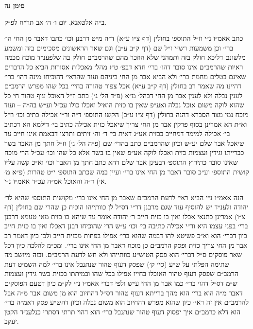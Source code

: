 \documentclass[12pt, openany]{book}
\newcommand{\chapname}{}
\newcommand{\newchap}[1]{
	\addcontentsline{toc}{chapter}{#1}
	\renewcommand{\chapname}{#1}
		\begin{center}
			\textbf{%
\fontsize{16pt}{16pt}\selectfont
				#1}
		\end{center}
}
\begin{document}
\newchap{סימן נה}
\begin{multicols}{2}
ב״ה אלטאנא, יום ו׳ ה׳ אב תר״ח לפ״ק.\\\vspace{0pt}

כתב אאמ״ו נ״י וז״ל התוספ׳ בחולין (דף צ״ו ע״א) ד״ה מ״ט דרבנן וכו׳ כתבו דאבר מן החי הו׳ ברי׳ וכן משמעות רש״י ז״ל שם (דף ק״ב ע״ב) וגם שאר הראשונים מסכימים בזה ומשמע מלשונם דליכא חולק בזה ותמהני שלא הוזכר מהם שהרמב״ם חולק בה שלפענ״ד מוכח מכמה ראיות שהרמב״ם אינו סובר דהו׳ ברי׳ חדא דבפ׳ ט״ז מהל׳ מאכלות אסורות הביא כל הדברים שאינם בטלים מחמת ברי׳ ולא הביא אבר מן החי ביניהם ועוד שהראי׳ דהוכיחו מינה דהו׳ ברי׳ דהיינו מה שאמר רב בחולין (דף ק״ב ע״א) אכל צפור טהורה בחיי׳ בכל שהו מפרש הרמב״ם לענין נבלה ולא לענין אבר מן החי דבהל׳ מ״א (פ״ד הל׳ ג׳) כתב וז״ל האוכל עוף טהור חי כל שהוא לוקה משום אוכל נבלה ואע״פ שאין בו כזית הואיל ואכלו כולו עכ״ל וע״ש בה״ה – ועוד מוכח נמי מצד הסברא דהנה בחולין (דף צ״ו ע״ב) הקשו התוספ׳ ד״ה ור״י אכילה כתיב וכו׳ וז״ל וא״ת הא אמרינן בסוף פרקין אבר מן החי צריך שיאכל כזית אכילה כתיב בי׳ דילמא הא דכתיב בי׳ אכילה למימר דמחייב בכזית אע״ג דאית בי׳ ד׳ וה׳ זיתים ותרצו דבאמת אינו חייב עד שיאכל אבר שלם יע״ש וכיון שהרמב״ם כתב בהדי׳ שם (פ״ה הל׳ ג׳) וז״ל חתך מן האבר בשר כברייתו וגידין ועצמות כזית ואכלו לוקה אע״פ שאין בו בשר אלא כל שהו וכו׳ עכ״ל הרי מוכח שאינו סובר כתירוץ התוספ׳ דבעינן אבר שלם דהא כתב חתך מן האבר וכו׳ וא״כ קשה עליו קושית התוספ׳ וע״כ סובר דאבר מן החי אינו ברי׳ ועיין במה שכתב התוספ׳ י״ט טהרות (פ״א מ׳ א׳) ד״ה והאוכל אמ״ה עכ״ד אאמ״ו נ״י.\\\vspace{0pt}

הנה אאמ״ו נ״י הביא ראי׳ לדעת הרמב״ם שאבר מן החי אינו ברי׳ מקושית התוספ׳ שהיא לר׳ יהודה ולענ״ד יש להוסיף עוד שגם מרבנן דר״י דס״ל לן כוותייהו הוכיח כן שהרי שם בחולין (דף צ״ו) אמרינן כתנאי אכלו ואין בו כזית חייב ר׳ יהודה אומר עד שיהא בו כזית מאי טעמא דרבנן ברי׳ בפני עצמו היא ור״י אכילה כתיבה בי׳ וכו׳ ע״ש הרי שהוכיחו רבנן דאכלו ואין בו כזית חייב כיון דברי׳ הוא וא״כ פשיטא להו דבמה שהוא ברי׳ אפילו בפחות מכזית חייב ולכן כיון דאמר רב אבר מן החי צריך כזית ופסק הרמב״ם כן מוכח דאבר מן החי אינו ברי׳. ומכ״מ להלכה כיון דכל שאר פוסקים ס״ל דברי׳ הוא פסק הטוש״ע כוותייהו ולא חש לדעת הרמב״ם. ובזה מיושב מה שתימה הפלתי על ש״ע (סי׳ ק׳) שפסק דעוף טהור שנתנבל אינו ברי׳ למה השמיט דעת הרמב״ם שפסק דעוף טהור האוכלו בחייו אפילו בכל שהו ובמיתתו בכזית בשר גידין ועצמות ש״מ דס״ל דהוי ברי׳ כמו אבר מן החי ע״ש ולפי דברי אאמ״ו נ״י לק״מ כיון דטעם הפוסקים דאבר מ״ה הוא ברי׳ הוא מהך ברייתא דעוף טהור דס״ל דהחיוב הוא מן משום אבר מ״ה אבל להרמב״ם אין זה ראי׳ כיון שהוא מפרש דהחיוב הוא משום נבלה וכיון דהש״ע פסק דאמ״ה ברי׳ הוא דלא כרמב״ם איך יפסוק דעוף טהור שנתנבל ברי׳ הוא דהוי תרתי דסתרי כנלענ״ד הקטן יעקב.\\\vspace{0pt}

\end{multicols}\newpage
\end{document}
